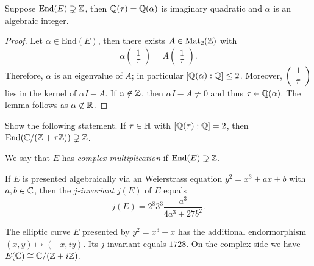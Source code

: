 \begin{lemma}
  \label{lem:tauimagquad}
  Suppose $\mathrm{End}(E) \supsetneq {\mathbb{Z}}$, then
  ${\mathbb{Q}}(\tau)={\mathbb{Q}}(\alpha)$
  is imaginary
  quadratic and $\alpha$ is an algebraic integer. 
\end{lemma}
\begin{proof}
  Let $\alpha\in \mathrm{End}(E)$, then there exists $A\in\mathrm{Mat}_2({\mathbb{Z}})$ with
  \begin{equation*}
    \alpha \left(
      \begin{array}{c}
        1 \\ \tau 
      \end{array}
    \right) = %
    A\left(
      \begin{array}{c}
        1 \\ \tau 
      \end{array}
    \right).
  \end{equation*}
  Therefore, $\alpha$ is an eigenvalue of $A$; in particular
  $[{\mathbb{Q}}(\alpha):{\mathbb{Q}}]\le 2$. Moreover, $\left( \begin{array}{c} {1} \\ {\tau} \end{array} \right)$ lies in the
  kernel of $\alpha I-A$. If $\alpha\not\in {\mathbb{Z}}$, then $\alpha
  I-A\not=0$ and thus $\tau \in {\mathbb{Q}}(\alpha)$. The lemma follows as
  $\alpha\not\in{\mathbb{R}}$. 
\end{proof}

\begin{exercise}
  Show the following statement. If $\tau \in{\mathbb{H}}$  with
  $[{\mathbb{Q}}(\tau):{\mathbb{Q}}]=2$, then $\mathrm{End}({\mathbb{C}}/({\mathbb{Z}}+\tau {\mathbb{Z}}))\supsetneq
  {\mathbb{Z}}$. 
\end{exercise}

\begin{definition}
  We say that $E$ has \emph{complex multiplication} if
  $\mathrm{End}(E)\supsetneq {\mathbb{Z}}$. 
\end{definition}

\begin{definition}
  If $E$ is presented algebraically via an Weierstrass equation $y^2 =
  x^3+ax+b$ with $a,b\in{\mathbb{C}}$,  then the \emph{$j$-invariant} $j(E)$ of $E$ equals
  \begin{equation*}
    j(E) = 2^8 3^3 \frac{a^3}{4a^3+27b^2}. 
  \end{equation*}  
\end{definition}

\begin{example}
  The elliptic curve $E$ presented by $y^2=x^3+x$ has the additional
  endormorphism
  $(x,y)\mapsto (-x, i y)$. Its $j$-invariant equals $1728$. On the
  complex side we have $E({\mathbb{C}})\cong {\mathbb{C}}/({\mathbb{Z}}+i
  {\mathbb{Z}})$. 
\end{example}

